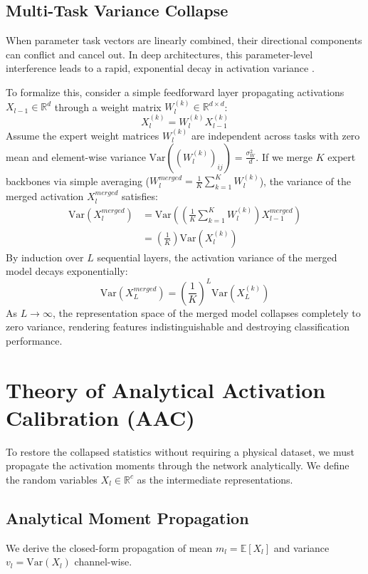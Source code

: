 \documentclass{article}
\theoremstyle{plain}
\theoremstyle{definition}
\theoremstyle{remark}
\begin{document}
\subsection{Multi-Task Variance Collapse}
When parameter task vectors are linearly combined, their directional components can conflict and cancel out. In deep architectures, this parameter-level interference leads to a rapid, exponential decay in activation variance \cite{submission5,jordan2022repair}.

To formalize this, consider a simple feedforward layer propagating activations $X_{l-1} \in \mathbb{R}^d$ through a weight matrix $W_l^{(k)} \in \mathbb{R}^{d \times d}$:
\begin{equation}
    X_l^{(k)} = W_l^{(k)} X_{l-1}^{(k)}
\end{equation}
Assume the expert weight matrices $W_l^{(k)}$ are independent across tasks with zero mean and element-wise variance $\text{Var}((W_l^{(k)})_{ij}) = \frac{\sigma_W^2}{d}$. If we merge $K$ expert backbones via simple averaging ($W_l^{merged} = \frac{1}{K}\sum_{k=1}^K W_l^{(k)}$), the variance of the merged activation $X_l^{merged}$ satisfies:
\begin{align}
    \text{Var}(X_l^{merged}) &= \text{Var}\left( \left( \frac{1}{K}\sum_{k=1}^K W_l^{(k)} \right) X_{l-1}^{merged} \right) \nonumber \\
    &= \left( \frac{1}{K} \right) \text{Var}(X_l^{(k)})
\end{align}
By induction over $L$ sequential layers, the activation variance of the merged model decays exponentially:
\begin{equation}
    \text{Var}(X_L^{merged}) = \left( \frac{1}{K} \right)^L \text{Var}(X_L^{(k)})
\end{equation}
As $L \to \infty$, the representation space of the merged model collapses completely to zero variance, rendering features indistinguishable and destroying classification performance.

\section{Theory of Analytical Activation Calibration (AAC)}
\label{sec:theory}

To restore the collapsed statistics without requiring a physical dataset, we must propagate the activation moments through the network analytically. We define the random variables $X_l \in \mathbb{R}^c$ as the intermediate representations.

\subsection{Analytical Moment Propagation}
We derive the closed-form propagation of mean $m_l = \mathbb{E}[X_l]$ and variance $v_l = \text{Var}(X_l)$ channel-wise.
\end{document}
